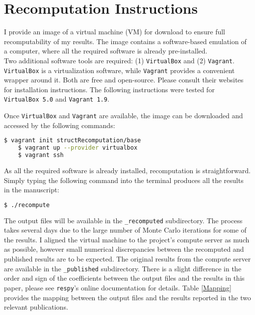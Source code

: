 \section{Recomputation Instructions}
I provide an image of a virtual machine (VM) for download to ensure full recomputability of my results. The image contains a software-based emulation of a computer, where all the required software is already pre-installed.\\\newline
%
Two additional software tools are required: (1)  \texttt{VirtualBox} and (2) \texttt{Vagrant}. \texttt{VirtualBox} is a virtualization software, while \texttt{Vagrant} provides a convenient wrapper around it. Both are free and open-source. Please consult their websites for installation instructions. The following instructions were tested for \texttt{VirtualBox 5.0} and \texttt{Vagrant 1.9}.\newline

Once \texttt{VirtualBox} and \texttt{Vagrant} are available, the image can be downloaded and accessed by the following commands:

\vspace{0.2cm}\begin{lstlisting}[language=bash]
    $ vagrant init structRecomputation/base
    $ vagrant up --provider virtualbox
    $ vagrant ssh
\end{lstlisting}\vspace{0.2cm}

As all the required software is already installed, recomputation is straightforward. Simply typing the following command into the terminal produces all the results in the manuscript:
\vspace{0.2cm}\begin{lstlisting}[language=bash]
    $ ./recompute
\end{lstlisting}\vspace{0.2cm}

The output files will be available in the \verb+_recomputed+ subdirectory. The process takes several days due to the large number of Monte Carlo iterations for some of the results. I aligned the virtual machine to the project's compute server as much as possible, however small numerical discrepancies between the recomputed and published results are to be expected. The original results from the compute server are available in the \verb+_published+ subdirectory. There is a slight difference in the order and sign of the coefficients between the output files and the results in this paper, please see  \verb+respy+'s online documentation for details. Table \ref{Mapping} provides the mapping between the output files and the results reported in the two relevant publications.


\clearpage
